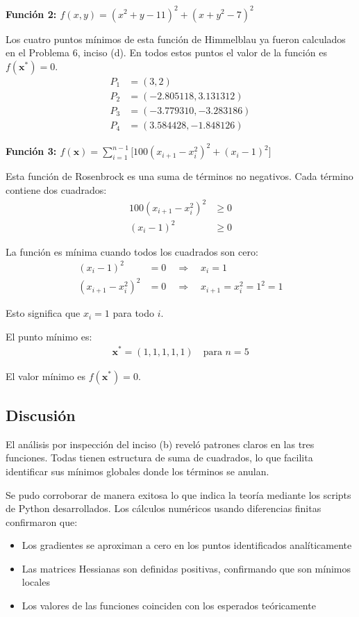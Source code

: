 \documentclass{article}
\begin{document}
\textbf{Función 2: $f(x,y) = (x^{2}+y-11)^{2} + (x+y^{2}-7)^{2}$}

Los cuatro puntos mínimos de esta función de Himmelblau ya fueron calculados en el Problema 6, inciso (d). En todos estos puntos el valor de la función es $f(\mathbf{x}^*) = 0$.
\begin{align}
P_1 &= (3, 2) \\
P_2 &= (-2.805118, 3.131312) \\
P_3 &= (-3.779310, -3.283186) \\
P_4 &= (3.584428, -1.848126)
\end{align}

\textbf{Función 3: $f(\mathbf{x}) = \sum_{i=1}^{n-1} \bigl[100(x_{i+1}-x_i^{2})^{2} + (x_i-1)^{2}\bigr]$}

Esta función de Rosenbrock es una suma de términos no negativos. Cada término contiene dos cuadrados:
\begin{align}
100(x_{i+1} - x_i^2)^2 &\geq 0 \\
(x_i - 1)^2 &\geq 0
\end{align}

La función es mínima cuando todos los cuadrados son cero:
\begin{align}
(x_i - 1)^2 &= 0 \quad \Rightarrow \quad x_i = 1 \\
(x_{i+1} - x_i^2)^2 &= 0 \quad \Rightarrow \quad x_{i+1} = x_i^2 = 1^2 = 1
\end{align}

Esto significa que $x_i = 1$ para todo $i$.

El punto mínimo es:
\begin{align}
\mathbf{x}^* = (1, 1, 1, 1, 1) \quad \text{para } n = 5
\end{align}

El valor mínimo es $f(\mathbf{x}^*) = 0$.

\subsection{Discusión}

El análisis por inspección del inciso (b) reveló patrones claros en las tres funciones. Todas tienen estructura de suma de cuadrados, lo que facilita identificar sus mínimos globales donde los términos se anulan.

Se pudo corroborar de manera exitosa lo que indica la teoría mediante los scripts de Python desarrollados. Los cálculos numéricos usando diferencias finitas confirmaron que:
\begin{itemize}
    \item Los gradientes se aproximan a cero en los puntos identificados analíticamente
    \item Las matrices Hessianas son definidas positivas, confirmando que son mínimos locales
    \item Los valores de las funciones coinciden con los esperados teóricamente
\end{itemize}
\end{document}
